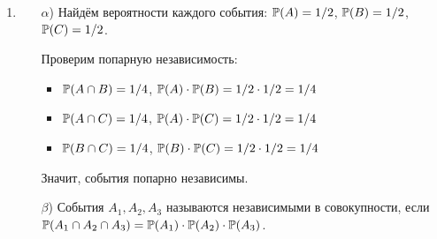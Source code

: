 \documentclass[12pt, a4paper]{article}\usepackage[]{graphicx}\usepackage[]{color}
\begin{document}
\begin{enumerate}
\item
\begin{enumerate}
\item[$\alpha$)] Найдём вероятности каждого события: $\P(A) = 1/2$, $\P(B) = 1/2$, $\P(C) = 1/2$.

Проверим попарную независимость:
\begin{itemize}
\item $\P(A \cap B) = 1/4$, $\P(A) \cdot \P(B) = 1/2 \cdot 1/2 = 1/4$
\item $\P(A \cap C) = 1/4$, $\P(A) \cdot \P(C) = 1/2 \cdot 1/2 = 1/4$
\item $\P(B \cap C) = 1/4$, $\P(B) \cdot \P(C) = 1/2 \cdot 1/2 = 1/4$
\end{itemize}
Значит, события попарно независимы.
\item[$\beta$)] События $A_1, A_2, A_3$ называются независимыми в совокупности, если $\P(A_1 \cap A_2 \cap A_3) = \P(A_1) \cdot \P(A_2) \cdot \P(A_3)$.


\end{enumerate}
\end{enumerate}
\end{document}
